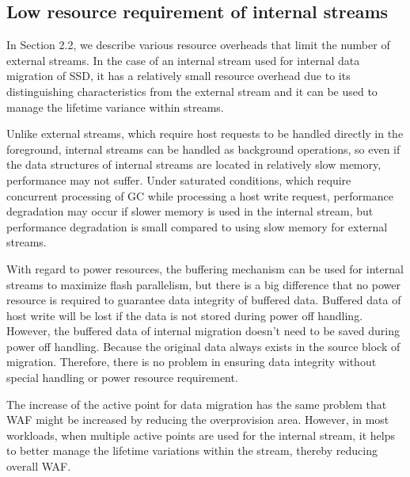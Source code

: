 \subsection{Low resource requirement of internal streams}

In Section 2.2, we describe various resource overheads that limit the number of external streams.
In the case of an internal stream used for internal data migration of SSD, 
it has a relatively small resource overhead due to its distinguishing characteristics from the external stream
and it can be used to manage the lifetime variance within streams.

Unlike external streams, which require host requests to be handled directly in the foreground,
internal streams can be handled as background operations, 
so even if the data structures of internal streams are located in relatively slow memory, 
performance may not suffer. 
Under saturated conditions, which require concurrent processing of GC while processing a host write request, performance degradation may occur if slower memory is used in the internal stream, but performance degradation is small compared to using slow memory for external streams.

With regard to power resources, the buffering mechanism can be used for internal streams to maximize flash parallelism, but there is a big difference that no power resource is required to guarantee data integrity of buffered data.
Buffered data of host write will be lost if the data is not stored during power off handling.
However, the buffered data of internal migration doesn't need to be saved during power off handling. Because the original data always exists in the source block of migration. Therefore, there is no problem in ensuring data integrity without special handling or power resource requirement.

The increase of the active point for data migration has the same problem that WAF might be increased by reducing the overprovision area. However, in most workloads, when multiple active points are used for the internal stream, it helps to better manage the lifetime variations within the stream, thereby reducing overall WAF.

